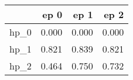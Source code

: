 \begin{tabular}{lrrr}
\toprule
{} &   ep 0 &   ep 1 &   ep 2 \\
\midrule
hp\_0 &  0.000 &  0.000 &  0.000 \\
hp\_1 &  0.821 &  0.839 &  0.821 \\
hp\_2 &  0.464 &  0.750 &  0.732 \\
\bottomrule
\end{tabular}
